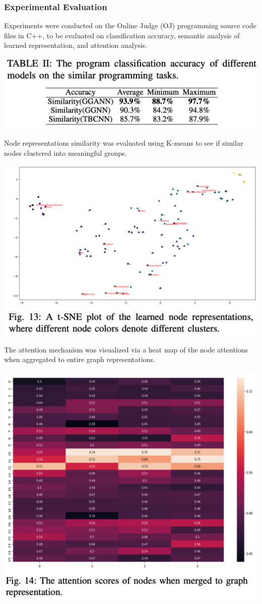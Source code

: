 \documentclass{article}
\begin{document}
\subsubsection{Experimental Evaluation}
Experiments were conducted on the Online Judge (OJ) programming source code files in C++, to be evaluated on classification accuracy, semantic analysis of learned representation, and attention analysis.
\centerline{\includegraphics[width=\columnwidth]{Images/Similarity2-7.png}}
Node representations similarity was evaluated using K-means to see if similar nodes clustered into meaningful groups.
\centerline{\includegraphics[width=\columnwidth]{Images/Similarity2-8.png}}
The attention mechanism was visualized via a heat map of the node attentions when aggregated to entire graph representations.
\centerline{\includegraphics[width=\columnwidth]{Images/Similarity2-9.png}}
\end{document}

